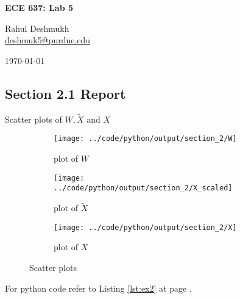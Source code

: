\documentclass[a4paper,11pt]{article}
\newcommand{\reflst}[1]{Listing \ref{#1} at page \pageref{#1}}
\begin{document}
\begin{center}
\Large{\textbf{ECE 637: Lab 5}}

Rahul Deshmukh\\\href{mailto:deshmuk5@purdue.edu}{{\color{blue}deshmuk5@purdue.edu}}

\today
\end{center}

\subsection*{Section 2.1 Report} 

Scatter plots of $W,\tilde{X}$ and $X$
\begin{figure}[!hp]
 \centering
 \begin{subfigure}{0.3\textwidth}
 \texttt{[image: ../code/python/output/section\_2/W]}
 \caption{plot of $W$}
 \end{subfigure}
%  
 \begin{subfigure}{0.3\textwidth}
 \texttt{[image: ../code/python/output/section\_2/X\_scaled]}
 \caption{plot of $\tilde{X}$}
 \end{subfigure}
%  
 \begin{subfigure}{0.3\textwidth}
 \texttt{[image: ../code/python/output/section\_2/X]}
 \caption{plot of $X$}
 \end{subfigure}
 \caption{Scatter plots}
\end{figure}

For python code refer to \reflst{lst:ex2}.

\clearpage
\end{document}
